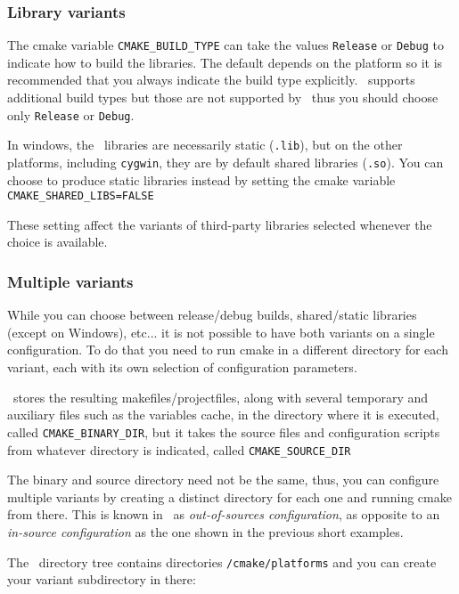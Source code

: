 \subsubsection{Library variants}

The cmake variable \texttt{CMAKE\_BUILD\_TYPE} can take the values \texttt{Release} or \texttt{Debug} to indicate how to build
the libraries. The default depends on the platform so it is recommended that you always indicate the build type explicitly.
\cmake\ supports additional build types but those are not supported by \cgal\, thus you should choose only
\texttt{Release} or \texttt{Debug}.

In windows, the \cgal\ libraries are necessarily static
({\tt .lib}), but on the other platforms, including \texttt{cygwin}, they are by default shared libraries ({\tt .so}).
You can choose to produce static libraries instead by setting the cmake variable {\tt CMAKE\_SHARED\_LIBS=FALSE} 

These setting affect the variants of third-party libraries selected whenever the choice is available.

\subsubsection{Multiple variants}\label{sec:cmake-out-of-source}

While you can choose between release/debug builds, shared/static libraries
(except on Windows), etc...
it is not possible to have both variants on a single configuration. To do that you need to run cmake in a 
different directory for each variant, each with its own selection of configuration parameters.

\cmake\ stores the resulting makefiles/projectfiles, along with several temporary and auxiliary files such
as the variables cache, in the directory where it is executed, called \texttt{CMAKE\_BINARY\_DIR}, but it
takes the source files and configuration scripts from whatever directory is indicated, called
\texttt{CMAKE\_SOURCE\_DIR} 

The binary and source directory need not be the same, thus, you can configure multiple variants by creating a
distinct directory for each one and running cmake from there. This is known in \cmake\ as 
{\em out-of-sources configuration}, as opposite to an {\em in-source configuration} as the one shown in the 
previous short examples.

The \cgal\ directory tree contains directories \cgaldir{}\texttt{/cmake/platforms} and you can create your 
variant subdirectory in there:

